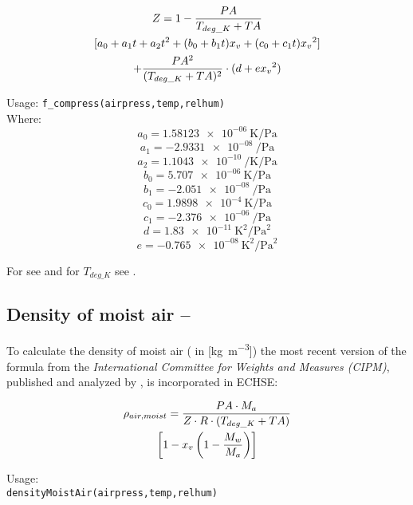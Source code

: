 \begin{multline}\label{eqn:meteo:compressfac}
\compressibilityFactor{} = 1 - \frac{\airPressure{}}{T_{deg\_K} + \airtemp{}} \\
[a_0 + a_1 t + a_2 t^2 + (b_0 + b_1 t) \moleFracWaterVap{} + (c_0 + c_1 t) \moleFracWaterVap{}^2 ] \\
+ \frac{\airPressure{}^2}{(T_{deg\_K} + \airtemp{})^2} \cdot (d + e \moleFracWaterVap{}^2)
\end{multline}

\noindent
Usage:
\verb!f_compress(airpress,temp,relhum)!\\

\noindent
Where:
\[ a_0 = \SI{1.58123e-06}{\kelvin\per\pascal} \]
\[ a_1 = \SI{-2.9331e-08}{\per\pascal} \]
\[ a_2 = \SI{1.1043e-10}{\per\kelvin\per\pascal} \]
\[ b_0 = \SI{5.707e-06}{\kelvin\per\pascal} \]
\[ b_1 = \SI{-2.051e-08}{\per\pascal} \]
\[ c_0 = \SI{1.9898e-4}{\kelvin\per\pascal} \]
\[ c_1 = \SI{-2.376e-06}{\per\pascal} \]
\[ d = \SI{1.83e-11}{\kelvin\squared\per\pascal\squared} \]
\[ e = \SI{-0.765e-08}{\kelvin\squared\per\pascal\squared} \]

For \moleFracWaterVap{} see  and for $T_{deg\_K}$ see .


\subsection{Density of moist air -- \densityAirMoist} \label{sec:meteo:densairmoist}
To calculate the density of moist air (\densityAirMoist{} in [\si{\kilo\gram\per\cubic\metre}]) the most recent version of the formula from the \emph{International Committee for Weights and Measures (CIPM)}, published and analyzed by \citet{Picard2008}, is incorporated in ECHSE:

\begin{multline}\label{eqn:meteo:densairmoist}
\rho_{air,moist}{} = \frac{PA{} \cdot M_{a}{}}{Z{} \cdot R \cdot (T_{deg\_K} + TA{})} \\
\left[ 1 - x_{v}{} \left( 1 - \frac{M_{w}{}}{M_{a}{}} \right) \right]
\end{multline}

\noindent
Usage:\\
\verb!densityMoistAir(airpress,temp,relhum)!\\

